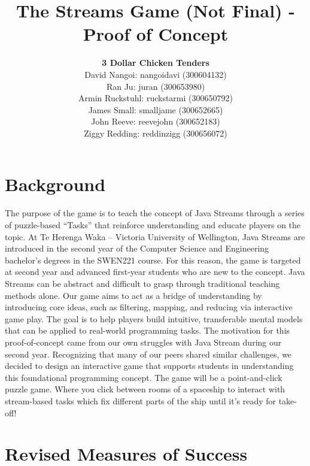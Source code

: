 \documentclass{article}
\title{The Streams Game (Not Final) - Proof of Concept}
\author{ 
    \textbf{3 Dollar Chicken Tenders}
    \\
    David Nangoi: nangoidavi (300604132) \\ 
    Ran Ju: juran (300653980) \\ 
    Armin Ruckstuhl: ruckstarmi (300650792) \\ 
    James Small: smalljame (300652665) \\ 
    John Reeve: reevejohn (300652183) \\ 
    Ziggy Redding: reddinzigg (300656072) 
}
\date{}
\begin{document}
\maketitle

\section{Background}
The purpose of the game is to teach the concept of Java Streams through a series of puzzle-based “Tasks” that reinforce understanding and educate players on the topic. At Te Herenga Waka – Victoria University of Wellington, Java Streams are introduced in the second year of the Computer Science and Engineering bachelor’s degrees in the SWEN221 course. For this reason, the game is targeted at second year and advanced first-year students who are new to the concept. 
\newline\newline
Java Streams can be abstract and difficult to grasp through traditional teaching methods alone. Our game aims to act as a bridge of understanding by introducing core ideas, such as filtering, mapping, and reducing via interactive game play. The goal is to help players build intuitive, transferable mental models that can be applied to real-world programming tasks. 
\newline\newline
The motivation for this proof-of-concept came from our own struggles with Java Stream during our second year. Recognizing that many of our peers shared similar challenges, we decided to design an interactive game that supports students in understanding this foundational programming concept. 
\newline\newline
The game will be a point-and-click puzzle game. Where you click between rooms of a spaceship to interact with stream-based tasks which fix different parts of the ship until it’s ready for take-off! 



\section{Revised Measures of Success}
\end{document}
